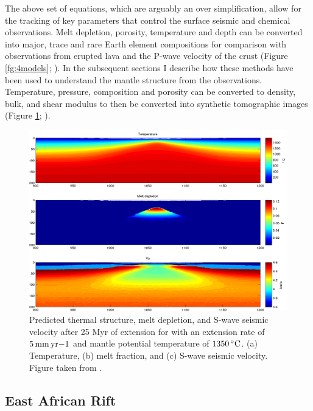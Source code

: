The above set of equations, which are arguably an over simplification, allow for the tracking of key parameters that control the surface seismic and chemical observations. Melt depletion, porosity, temperature and depth can be converted into major, trace and rare Earth element compositions for comparison with observations from erupted lava and the P-wave velocity of the crust (Figure \ref{fg:4models}; \citealp{armitage-etal-2008,armitage-etal-2010,armitage-etal-epsl-2015,armitage-etal-g3-2018,armitage-etal-grl-2019}). In the subsequent sections I describe how these methods have been used to understand the mantle structure from the observations. Temperature, pressure, composition and porosity can be converted to density, bulk, and shear modulus to then be converted into synthetic tomographic images (Figure \ref{fg:mantleVs}; \citealp{goes-etal-2012,armitage-etal-epsl-2015,armitage-etal-g3-2018,armitage-etal-grl-2019}). 

\begin{figure}
\centering
\includegraphics[width=\textwidth]{./figures/ch2-mantleVs.pdf}
\caption{Predicted thermal structure, melt depletion, and S-wave seismic velocity after 25 Myr of extension for with an extension rate of $5\rm\,mm\,yr{-1}$ and mantle potential temperature of $1350\rm\,^{\circ}C$. (a) Temperature, (b) melt fraction, and (c) S-wave seismic velocity. Figure taken from \cite{armitage-etal-g3-2018}.}
\label{fg:mantleVs}
\end{figure}

\subsection{East African Rift}

